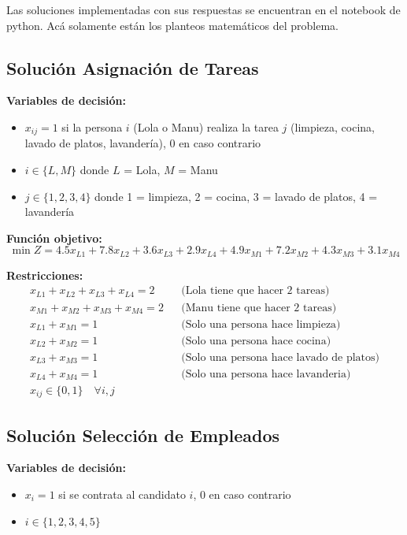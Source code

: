 \documentclass[12pt]{article}
\begin{document}
Las soluciones implementadas con sus respuestas se encuentran en el notebook de python. Acá solamente están los planteos matemáticos del problema.

\subsection{Solución Asignación de Tareas}

\textbf{Variables de decisión:}
\begin{itemize}
    \item $x_{ij} = 1$ si la persona $i$ (Lola o Manu) realiza la tarea $j$ (limpieza, cocina, lavado de platos, lavandería), 0 en caso contrario
    \item $i \in \{L, M\}$ donde $L$ = Lola, $M$ = Manu
    \item $j \in \{1, 2, 3, 4\}$ donde 1 = limpieza, 2 = cocina, 3 = lavado de platos, 4 = lavandería
\end{itemize}

\textbf{Función objetivo:}
$$\min Z = 4.5x_{L1} + 7.8x_{L2} + 3.6x_{L3} + 2.9x_{L4} + 4.9x_{M1} + 7.2x_{M2} + 4.3x_{M3} + 3.1x_{M4}$$

\textbf{Restricciones:}
\begin{align*}
    x_{L1} + x_{L2} + x_{L3} + x_{L4} = 2 && \text{(Lola tiene que hacer 2 tareas)} \\
    x_{M1} + x_{M2} + x_{M3} + x_{M4} = 2 && \text{(Manu tiene que hacer 2 tareas)} \\
    x_{L1} + x_{M1} = 1 && \text{(Solo una persona hace limpieza)} \\
    x_{L2} + x_{M2} = 1 && \text{(Solo una persona hace cocina)} \\
    x_{L3} + x_{M3} = 1 && \text{(Solo una persona hace lavado de platos)} \\
    x_{L4} + x_{M4} = 1 && \text{(Solo una persona hace lavanderia)} \\
    x_{ij} \in \{0,1\} \quad \forall i,j
\end{align*}

\subsection{Solución Selección de Empleados}

\textbf{Variables de decisión:}
\begin{itemize}
    \item $x_i = 1$ si se contrata al candidato $i$, 0 en caso contrario
    \item $i \in \{1, 2, 3, 4, 5\}$
\end{itemize}
\end{document}
